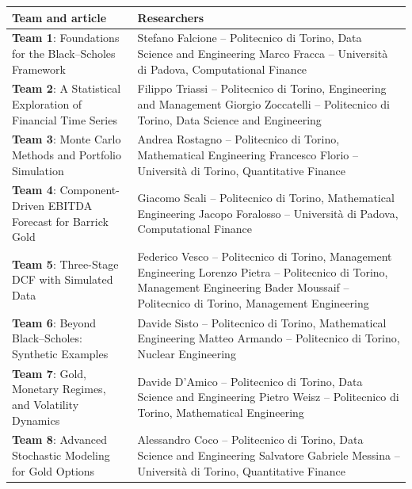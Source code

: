 \medskip
{\small
\renewcommand{\arraystretch}{1.02}
\begin{tabularx}{\textwidth}{@{}>{\raggedright\arraybackslash}p{5.4cm} >{\raggedright\arraybackslash}X@{}}
\toprule
\textbf{Team and article} & \textbf{Researchers} \\
\midrule
\textbf{Team 1}: Foundations for the Black--Scholes Framework &
Stefano Falcione -- Politecnico di Torino, Data Science and Engineering\newline
Marco Fracca -- Universit\`a di Padova, Computational Finance \\
\textbf{Team 2}: A Statistical Exploration of Financial Time Series &
Filippo Triassi -- Politecnico di Torino, Engineering and Management\newline
Giorgio Zoccatelli -- Politecnico di Torino, Data Science and Engineering \\
\textbf{Team 3}: Monte Carlo Methods and Portfolio Simulation &
Andrea Rostagno -- Politecnico di Torino, Mathematical Engineering\newline
Francesco Florio -- Universit\`a di Torino, Quantitative Finance \\
\textbf{Team 4}: Component-Driven EBITDA Forecast for Barrick Gold &
Giacomo Scali -- Politecnico di Torino, Mathematical Engineering\newline
Jacopo Foralosso -- Universit\`a di Padova, Computational Finance \\
\textbf{Team 5}: Three-Stage DCF with Simulated Data &
Federico Vesco -- Politecnico di Torino, Management Engineering\newline
Lorenzo Pietra -- Politecnico di Torino, Management Engineering\newline
Bader Moussaif -- Politecnico di Torino, Management Engineering \\
\textbf{Team 6}: Beyond Black--Scholes: Synthetic Examples &
Davide Sisto -- Politecnico di Torino, Mathematical Engineering\newline
Matteo Armando -- Politecnico di Torino, Nuclear Engineering \\
\textbf{Team 7}: Gold, Monetary Regimes, and Volatility Dynamics &
Davide D'Amico -- Politecnico di Torino, Data Science and Engineering\newline
Pietro Weisz -- Politecnico di Torino, Mathematical Engineering \\
\textbf{Team 8}: Advanced Stochastic Modeling for Gold Options &
Alessandro Coco -- Politecnico di Torino, Data Science and Engineering\newline
Salvatore Gabriele Messina -- Universit\`a di Torino, Quantitative Finance \\
\bottomrule
\end{tabularx}
}

